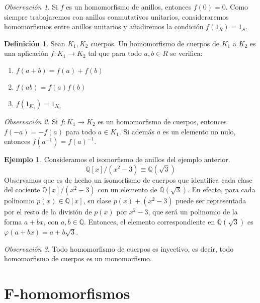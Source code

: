 \documentclass{report}
\theoremstyle{remark}
\newtheorem*{remark}{Observación}
\theoremstyle{definition}
\newtheorem{definition}{Definición}[chapter]
\theoremstyle{definition}
\theoremstyle{definition}
\newtheorem*{example}{Ejemplo}
\begin{document}
\begin{remark}
    Si $f$ es un homomorfismo de anillos, entonces $f(0) = 0$. Como siempre trabajaremos con anillos conmutativos unitarios, consideraremos homomorfismos entre anillos unitarios y añadiremos la condición $f(1_R) = 1_S$.
\end{remark}

\begin{definition}
    Sean $K_1, K_2$ cuerpos. Un homomorfismo de cuerpos de $K_1$ a $K_2$ es una aplicación $f : K_1 \to K_2$ tal que para todo $a, b \in R$ se verifica:
    \begin{enumerate}
        \item $f(a+b) = f(a) + f(b)$
        \item $f(ab) = f(a) f(b)$
        \item $f(1_{K_1}) = 1_{K_2}$
    \end{enumerate}
\end{definition}

\begin{remark}
    Si $f : K_1 \to K_2$ es un homomorfismo de cuerpos, entonces $f(-a) = -f(a)$ para todo $a \in K_1$.
    Si además $a$ es un elemento no nulo, entonces $f(a^{-1}) = f(a)^{-1}$.
\end{remark}

\begin{example}
    Consideramos el isomorfismo de anillos del ejemplo anterior.
    $$\mathbb{Q}[x] / (x^2 - 3) \equiv \mathbb{Q}(\sqrt{3})$$
    Observamos que es de hecho un isomorfismo de cuerpos que identifica cada clase del cociente $\mathbb{Q}[x] / (x^2 - 3)$ con un elemento de $\mathbb{Q}(\sqrt{3})$.
    En efecto, para cada polinomio $p(x) \in \mathbb{Q}[x]$, su clase $p(x) + (x^2 -3)$ puede ser representada por el resto de la división de $p(x)$ por $x^2 - 3$, que será un polinomio de la forma $a + bx$, con $a, b \in \mathbb{Q}$.
    Entonces, el elemento correspondiente en $\mathbb{Q}(\sqrt{3})$ es $\varphi(a + bx) = a + b\sqrt{3}$.
\end{example}

\begin{remark}
    Todo homomorfismo de cuerpos es inyectivo, es decir, todo homomorfismo de cuerpos es un monomorfismo.
\end{remark}

\section{F-homomorfismos}
\end{document}
